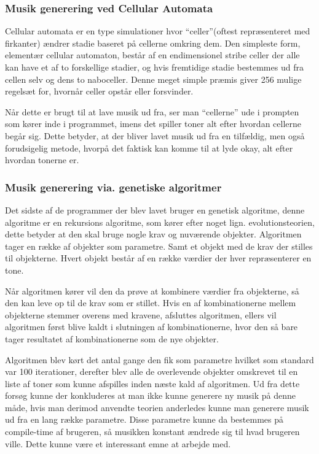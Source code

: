 \subsubsection{Musik generering ved Cellular Automata}

Cellular automata er en type simulationer hvor “celler”(oftest repræsenteret med firkanter) ændrer stadie baseret på cellerne omkring dem.
Den simpleste form, elementær cellular automaton, består af en endimensionel stribe celler der alle kan have et af to forskellige stadier, og hvis fremtidige stadie bestemmes ud fra cellen selv og dens to naboceller.
Denne meget simple præmis giver 256 mulige regelsæt for, hvornår celler opstår eller forsvinder.\cite{wolframCA}

Når dette er brugt til at lave musik ud fra, ser man “cellerne” ude i prompten som kører inde i programmet, imens det spiller toner alt efter hvordan cellerne begår sig.
Dette betyder, at der bliver lavet musik ud fra en tilfældig, men også forudsigelig metode, hvorpå det faktisk kan komme til at lyde okay, alt efter hvordan tonerne er.
\cite{CitationNeeded}



\subsubsection{Musik generering via.
genetiske algoritmer}

Det sidste af de programmer der blev lavet bruger en genetisk algoritme, denne algoritme er en rekursions algoritme, som kører efter noget lign.
evolutionsteorien, dette betyder at den skal bruge nogle krav og nuværende objekter.
Algoritmen tager en række af objekter som parametre.
Samt et objekt med de krav der stilles til objekterne.
Hvert objekt består af en række værdier der hver repræsenterer en tone.


Når algoritmen kører vil den da prøve at kombinere værdier fra objekterne, så den kan leve op til de krav som er stillet.
Hvis en af kombinationerne mellem objekterne stemmer overens med kravene, afsluttes algoritmen, ellers vil algoritmen først blive kaldt i slutningen af kombinationerne, hvor den så bare tager resultatet af kombinationerne som de nye objekter.

Algoritmen blev kørt det antal gange den fik som parametre hvilket som standard var 100 iterationer, derefter blev alle de overlevende objekter omskrevet til en liste af toner som kunne afspilles inden næste kald af algoritmen.
Ud fra dette forsøg kunne der konkluderes at man ikke kunne generere ny musik på denne måde, hvis man derimod anvendte teorien anderledes kunne man generere musik ud fra en lang række parametre.
Disse parametre kunne da bestemmes på compile-time af brugeren, så musikken konstant ændrede sig til hvad brugeren ville.
Dette kunne være et interessant emne at arbejde med.\cite{CitationNeeded}
